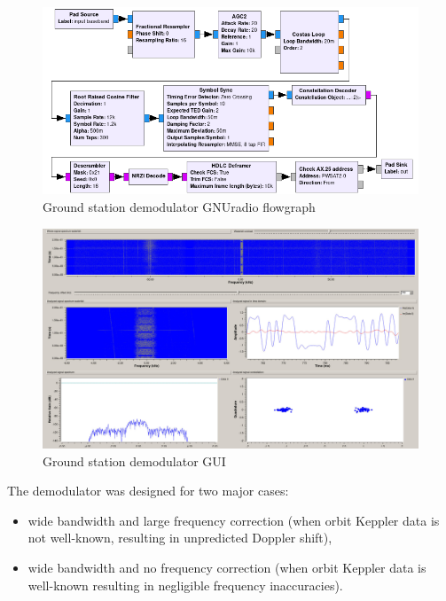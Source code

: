 \begin{figure}[H]
    \centering
    \includegraphics[width=0.6\paperwidth]{img/5/gs_demodulator_diagram.png}
    \caption{Ground station demodulator GNUradio flowgraph}
    \label{gs_demodulator_diagram}
\end{figure}

\begin{figure}[H]
    \centering
    \includegraphics[width=0.6\paperwidth]{img/5/gs_demodulator_gui.jpg}
    \caption{Ground station demodulator GUI}
    \label{gs_demodulator_gui}
\end{figure}

The demodulator was designed for two major cases:
\begin{itemize}
    \item wide bandwidth and large frequency correction (when orbit Keppler data is not well-known, resulting in unpredicted Doppler shift),
    \item wide bandwidth and no frequency correction (when orbit Keppler data is well-known resulting in negligible frequency inaccuracies).
\end{itemize}

